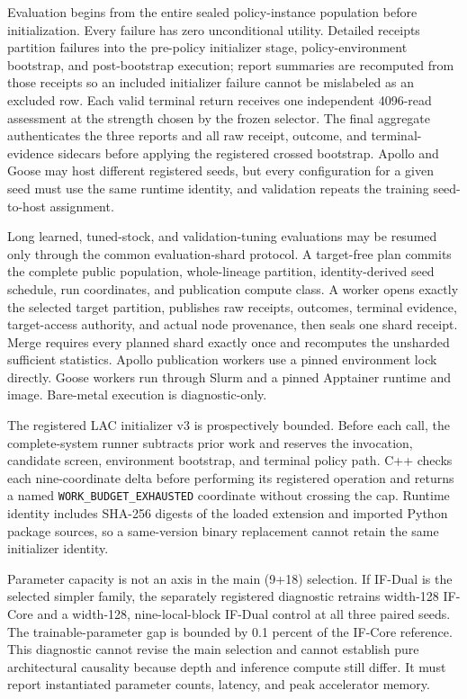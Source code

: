 \documentclass[10pt,a4paper]{article}
\begin{document}
Evaluation begins from the entire sealed policy-instance population
before initialization. Every failure has zero unconditional utility.
Detailed receipts partition failures into the pre-policy initializer
stage, policy-environment bootstrap, and post-bootstrap execution;
report summaries are recomputed from those receipts so an included
initializer failure cannot be mislabeled as an excluded row. Each valid
terminal return receives one independent 4096-read assessment at the
strength chosen by the frozen selector. The final aggregate
authenticates the three reports and all raw receipt, outcome, and
terminal-evidence sidecars before applying the registered crossed
bootstrap. Apollo and Goose may host different registered seeds, but
every configuration for a given seed must use the same runtime identity,
and validation repeats the training seed-to-host assignment.

Long learned, tuned-stock, and validation-tuning evaluations may be
resumed only through the common evaluation-shard protocol. A target-free
plan commits the complete public population, whole-lineage partition,
identity-derived seed schedule, run coordinates, and publication compute
class. A worker opens exactly the selected target partition, publishes
raw receipts, outcomes, terminal evidence, target-access authority, and
actual node provenance, then seals one shard receipt. Merge requires
every planned shard exactly once and recomputes the unsharded sufficient
statistics. Apollo publication workers use a pinned environment lock
directly. Goose workers run through Slurm and a pinned Apptainer runtime
and image. Bare-metal execution is diagnostic-only.

The registered LAC initializer v3 is prospectively bounded. Before each
call, the complete-system runner subtracts prior work and reserves the
invocation, candidate screen, environment bootstrap, and terminal policy
path. C++ checks each nine-coordinate delta before performing its
registered operation and returns a named
\texttt{WORK\_BUDGET\_EXHAUSTED} coordinate without crossing the cap.
Runtime identity includes SHA-256 digests of the loaded extension and
imported Python package sources, so a same-version binary replacement
cannot retain the same initializer identity.

Parameter capacity is not an axis in the main (9+18) selection. If
IF-Dual is the selected simpler family, the separately registered
diagnostic retrains width-128 IF-Core and a width-128,
nine-local-block IF-Dual control at all three paired seeds. The
trainable-parameter gap is bounded by 0.1 percent of the IF-Core
reference. This diagnostic cannot revise the main selection and cannot
establish pure architectural causality because depth and inference
compute still differ. It must report instantiated parameter counts,
latency, and peak accelerator memory.
\end{document}
